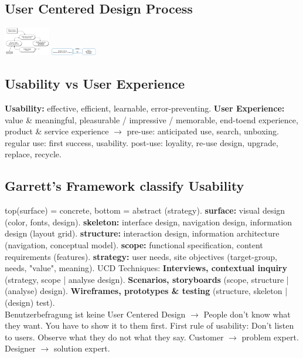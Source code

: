 \subsection{User Centered Design Process}
\includegraphics[width=0.15\textwidth]{user_centered_design_process.png}
\includegraphics[width=0.15\textwidth]{ucd_process.png}

\subsection{Usability vs User Experience}
\textbf{Usability:} effective, efficient, learnable, error-preventing.
\textbf{User Experience:} value \& meaningful, pleasurable / impressive / memorable, end-toend experience, product \& service experience $\rightarrow$ pre-use: anticipated use, search, unboxing. regular use: first success, usability. post-use: loyality, re-use design, upgrade, replace, recycle. 

\subsection{Garrett's Framework classify Usability}
top(surface) = concrete, bottom = abstract (strategy).
\textbf{surface:} visual design (color, fonts, design). \textbf{skeleton:} interface design, navigation design, information design (layout grid). \textbf{structure:} interaction design, information architecture (navigation, conceptual model). \textbf{scope:} functional specification, content requirements (features).
\textbf{strategy:} user needs, site objectives (target-group, needs, "value", meaning).
UCD Techniques: \textbf{Interviews, contextual inquiry} (strategy, scope | analyse design). \textbf{Scenarios, storyboards} (scope, structure | (analyse) design). \textbf{Wireframes, prototypes \& testing} (structure, skeleton | (design) test).
\\ Benutzerbefragung ist keine User Centered Design $\rightarrow$ People don't know what they want. You have to show it to them first. First rule of usability: Don't listen to users. Observe what they do not what they say. Customer $\rightarrow$ problem expert. Designer $\rightarrow$ solution expert.

